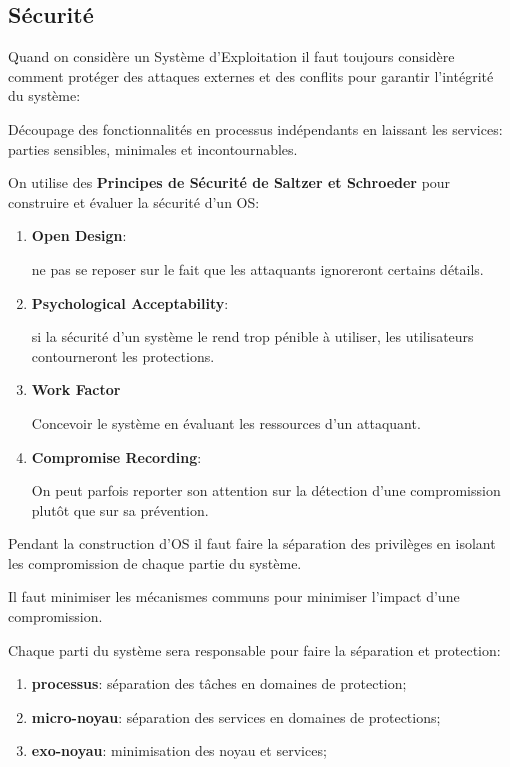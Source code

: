 \documentclass{article}
\begin{document}
\subsection{Sécurité}
Quand on considère un Système d'Exploitation il faut toujours considère comment protéger des attaques externes et des conflits pour garantir l'intégrité du système:
\begin{definition}
    Découpage des fonctionnalités en processus indépendants en laissant les services: parties sensibles, minimales et incontournables.
\end{definition}
On utilise des \textbf{Principes de Sécurité de Saltzer et Schroeder} pour construire et évaluer la sécurité d'un OS:
\begin{enumerate}[rightmargin=\leftmargin]
    \item \textbf{Open Design}:
    \begin{definition}
        ne pas se reposer sur le fait que les attaquants ignoreront certains détails.
    \end{definition}

    \item \textbf{Psychological Acceptability}:
    \begin{definition}
        si la sécurité d'un système le rend trop pénible à utiliser, les utilisateurs contourneront les protections.
    \end{definition}

    \item \textbf{Work Factor}
    \begin{definition}
        Concevoir le système en évaluant les ressources d'un attaquant.
    \end{definition}
    
    \item \textbf{Compromise Recording}:
    \begin{definition}
        On peut parfois reporter son attention sur la détection d'une compromission plutôt que sur sa prévention.
    \end{definition}
\end{enumerate}
Pendant la construction d'OS il faut faire la séparation des privilèges en isolant les compromission de chaque partie du système.
\begin{remark}
    Il faut minimiser les mécanismes communs pour minimiser l'impact d'une compromission.
\end{remark}
Chaque parti du système sera responsable pour faire la séparation et protection:
\begin{enumerate}[noitemsep]
    \item \textbf{processus}: séparation des tâches en domaines de protection;
    \item \textbf{micro-noyau}: séparation des services en domaines de protections;
    \item \textbf{exo-noyau}: minimisation des noyau et services;
\end{enumerate}
\end{document}

